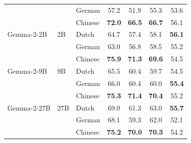 \documentclass[11pt]{article}
\begin{document}
\begin{table}[!ht]
\begin{tabular}{ll l cccc}
 &  & German & \cellcolor[rgb]{0.925,1.000,0.925} 57.2 & \cellcolor[rgb]{0.976,1.000,0.976} 51.9 & \cellcolor[rgb]{0.930,1.000,0.930} 55.3 & \cellcolor[rgb]{0.926,1.000,0.926} 53.6 \\
 &  & Chinese & \cellcolor[rgb]{0.771,1.000,0.771} \textbf{72.0} & \cellcolor[rgb]{0.792,1.000,0.792} \textbf{66.5} & \cellcolor[rgb]{0.779,1.000,0.779} \textbf{66.7} & \cellcolor[rgb]{0.875,1.000,0.875} 56.1 \\
\addlinespace[2pt]
Gemma-2-2B & 2B & Dutch & \cellcolor[rgb]{0.847,1.000,0.847} 64.7 & \cellcolor[rgb]{0.907,1.000,0.907} 57.4 & \cellcolor[rgb]{0.893,1.000,0.893} 58.1 & \cellcolor[rgb]{0.875,1.000,0.875} \textbf{56.1} \\
 &  & German & \cellcolor[rgb]{0.864,1.000,0.864} 63.0 & \cellcolor[rgb]{0.914,1.000,0.914} 56.8 & \cellcolor[rgb]{0.887,1.000,0.887} 58.5 & \cellcolor[rgb]{0.894,1.000,0.894} 55.2 \\
 &  & Chinese & \cellcolor[rgb]{0.730,1.000,0.730} \textbf{75.9} & \cellcolor[rgb]{0.731,1.000,0.731} \textbf{71.3} & \cellcolor[rgb]{0.741,1.000,0.741} \textbf{69.6} & \cellcolor[rgb]{0.908,1.000,0.908} 54.5 \\
\addlinespace[2pt]
Gemma-2-9B & 9B & Dutch & \cellcolor[rgb]{0.838,1.000,0.838} 65.5 & \cellcolor[rgb]{0.869,1.000,0.869} 60.4 & \cellcolor[rgb]{0.872,1.000,0.872} 59.7 & \cellcolor[rgb]{0.908,1.000,0.908} 54.5 \\
 &  & German & \cellcolor[rgb]{0.833,1.000,0.833} 66.0 & \cellcolor[rgb]{0.869,1.000,0.869} 60.4 & \cellcolor[rgb]{0.868,1.000,0.868} 60.0 & \cellcolor[rgb]{0.890,1.000,0.890} \textbf{55.4} \\
 &  & Chinese & \cellcolor[rgb]{0.736,1.000,0.736} \textbf{75.3} & \cellcolor[rgb]{0.730,1.000,0.730} \textbf{71.4} & \cellcolor[rgb]{0.730,1.000,0.730} \textbf{70.4} & \cellcolor[rgb]{0.894,1.000,0.894} 55.2 \\
\addlinespace[2pt]
Gemma-2-27B & 27B & Dutch & \cellcolor[rgb]{0.802,1.000,0.802} 69.0 & \cellcolor[rgb]{0.857,1.000,0.857} 61.3 & \cellcolor[rgb]{0.828,1.000,0.828} 63.0 & \cellcolor[rgb]{0.883,1.000,0.883} \textbf{55.7} \\
 &  & German & \cellcolor[rgb]{0.811,1.000,0.811} 68.1 & \cellcolor[rgb]{0.883,1.000,0.883} 59.3 & \cellcolor[rgb]{0.841,1.000,0.841} 62.0 & \cellcolor[rgb]{0.957,1.000,0.957} 52.1 \\
 &  & Chinese & \cellcolor[rgb]{0.737,1.000,0.737} \textbf{75.2} & \cellcolor[rgb]{0.748,1.000,0.748} \textbf{70.0} & \cellcolor[rgb]{0.731,1.000,0.731} \textbf{70.3} & \cellcolor[rgb]{0.914,1.000,0.914} 54.2 \\

\end{tabular}
\end{table}
\end{document}
